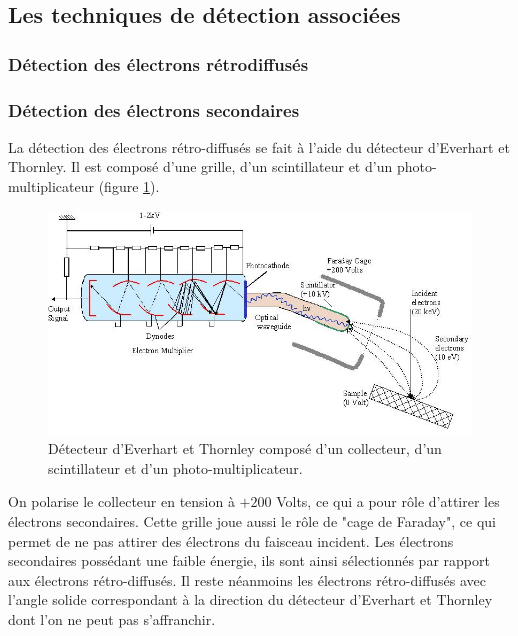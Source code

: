 \documentclass[a4paper,12pt]{article}
\newcommand\ett{Everhart et Thornley\xspace}
\begin{document}
\subsection{Les techniques de détection associées}

\subsubsection*{Détection des électrons rétrodiffusés}









\subsubsection*{Détection des électrons secondaires}

La détection des électrons rétro-diffusés se fait à l'aide du détecteur d'\ett. Il est composé d'une grille, d'un scintillateur et d'un photo-multiplicateur (figure \ref{fig:detect_ett}).

\begin{figure}
\centering
\includegraphics[width = 0.9 \textwidth]{images/detect_ett.png}
\caption{Détecteur d'\ett composé d'un collecteur, d'un scintillateur et d'un photo-multiplicateur.}
\label{fig:detect_ett}
\end{figure}
 
On polarise le collecteur en tension à $+200$ Volts, ce qui a pour rôle d'attirer les électrons secondaires. 
Cette grille joue aussi le rôle de "cage de Faraday", ce qui permet de ne pas attirer des électrons du faisceau incident. 
Les électrons secondaires possédant une faible énergie, ils sont ainsi sélectionnés par rapport aux électrons rétro-diffusés.
Il reste néanmoins les électrons rétro-diffusés avec l'angle solide correspondant à la direction du détecteur d'\ett dont l'on ne peut pas s'affranchir.
\end{document}

